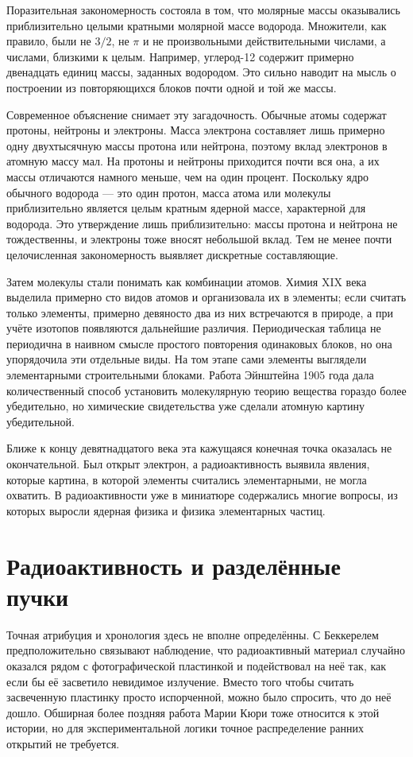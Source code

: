 Поразительная закономерность состояла в том, что молярные массы оказывались приблизительно целыми кратными молярной массе водорода. Множители, как правило, были не \(3/2\), не \(\pi\) и не произвольными действительными числами, а числами, близкими к целым. Например, углерод-12 содержит примерно двенадцать единиц массы, заданных водородом. Это сильно наводит на мысль о построении из повторяющихся блоков почти одной и той же массы.

Современное объяснение снимает эту загадочность. Обычные атомы содержат протоны, нейтроны и электроны. Масса электрона составляет лишь примерно одну двухтысячную массы протона или нейтрона, поэтому вклад электронов в атомную массу мал. На протоны и нейтроны приходится почти вся она, а их массы отличаются намного меньше, чем на один процент. Поскольку ядро обычного водорода — это один протон, масса атома или молекулы приблизительно является целым кратным ядерной массе, характерной для водорода. Это утверждение лишь приблизительно: массы протона и нейтрона не тождественны, и электроны тоже вносят небольшой вклад. Тем не менее почти целочисленная закономерность выявляет дискретные составляющие.

Затем молекулы стали понимать как комбинации атомов. Химия XIX века выделила примерно сто видов атомов и организовала их в элементы; если считать только элементы, примерно девяносто два из них встречаются в природе, а при учёте изотопов появляются дальнейшие различия. Периодическая таблица не периодична в наивном смысле простого повторения одинаковых блоков, но она упорядочила эти отдельные виды. На том этапе сами элементы выглядели элементарными строительными блоками. Работа Эйнштейна 1905 года дала количественный способ установить молекулярную теорию вещества гораздо более убедительно, но химические свидетельства уже сделали атомную картину убедительной.

Ближе к концу девятнадцатого века эта кажущаяся конечная точка оказалась не окончательной. Был открыт электрон, а радиоактивность выявила явления, которые картина, в которой элементы считались элементарными, не могла охватить. В радиоактивности уже в миниатюре содержались многие вопросы, из которых выросли ядерная физика и физика элементарных частиц.

\section{Радиоактивность и разделённые пучки}

Точная атрибуция и хронология здесь не вполне определённы. С Беккерелем предположительно связывают наблюдение, что радиоактивный материал случайно оказался рядом с фотографической пластинкой и подействовал на неё так, как если бы её засветило невидимое излучение. Вместо того чтобы считать засвеченную пластинку просто испорченной, можно было спросить, что до неё дошло. Обширная более поздняя работа Марии Кюри тоже относится к этой истории, но для экспериментальной логики точное распределение ранних открытий не требуется.

